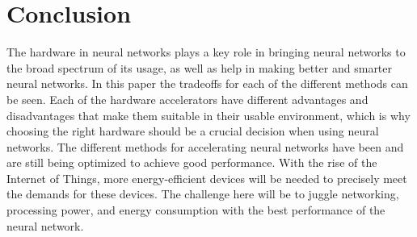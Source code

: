 \documentclass[conference]{IEEEtran}
\begin{document}
	\section{Conclusion}
	The hardware in neural networks plays a key role in bringing neural networks to the broad spectrum of its usage, as well as help in making better and smarter neural networks. In this paper the tradeoffs for each of the different methods can be seen. Each of the hardware accelerators have different advantages and disadvantages that make them suitable in their usable environment, which is why choosing the right hardware should be a crucial decision when using neural networks. The different methods for accelerating neural networks have been and are still being optimized to achieve good performance. With the rise of the Internet of Things, more energy-efficient devices will be needed to precisely meet the demands for these devices. The challenge here will be to juggle networking, processing power, and energy consumption with the best performance of the neural network.
	\\
	
	
\end{document}
